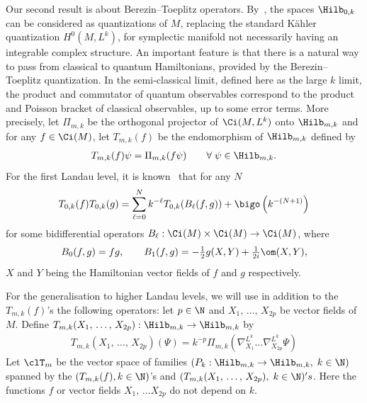 Our second result is about Berezin--Toeplitz operators. By~\cite{BoUr96}, the spaces $\Hilb_{0,k}$ can be considered as quantizations of $M$, replacing the standard K\"ahler quantization $H^0 (M,L^k)$, for symplectic manifold not necessarily having an integrable complex structure. An important feature is that there is a natural way to pass from classical to quantum Hamiltonians, provided by the Berezin--Toeplitz quantization. In the semi-classical limit, defined here as the large $k$ limit, the product and commutator of quantum observables correspond to the product and Poisson bracket of classical observables, up to some error terms. More precisely, let $\Pi_{m,k}$ be the orthogonal projector of $\Ci (M, L^k)$ onto $\Hilb_{m,k}$ and for any $f \in \Ci (M)$, let $T_{m,k} (f)$ be the endomorphism of $\Hilb_{m,k}$ defined by
\begin{gather}\label{eq:toeplitz}
T_{m,k} (f) \psi = \Pi_{m,k} (f \psi)
\qquad \forall \; \psi \in \Hilb_{m,k}.
\end{gather}
For the first Landau level, it is known~\cite{BoMeSc,oim_op,MaMa} that for any $N$
\begin{gather}\label{eq:t_0_k_produit_tout_ordre}
T_{0,k} (f) T_{0,k} (g) = \sum_{\ell = 0 } ^N k^{-\ell} T_{0,k} (B_\ell (f,g)) +
\bigo \left(k^{-(N+1)}\right)
\end{gather}
for some bidifferential operators $B_{\ell} : \Ci (M) \times \Ci (M)
\rightarrow \Ci (M)$, where
\begin{gather}\label{eq:b_0_b_1}
B_0 (f,g) = fg, \qquad B_1(f,g) = - \tfrac{1}{2} g(X,Y) + \tfrac{1}{2i} \om (X, Y),
\end{gather}
$X$ and $Y$ being the Hamiltonian vector fields of $f$ and $g$ respectively.


For the generalisation to higher Landau levels, we will use in addition to the $T_{m,k} (f)$'s the following operators: let $p \in \N$ and $X_1,\, \ldots,\, X_{2p}$ be vector fields of $M$. Define $ T_{m,k} (X_1,\, \ldots,\, X_{2p}):
\Hilb_{m,k} \rightarrow \Hilb_{m,k}$ by
\begin{gather}\label{eq:toep_der}
T_{m,k} (X_1, \,\ldots,\, X_{2p}) (\Psi) = k^{ -p} \Pi_{m,k} \left(\nabla^{L^k}_{X_1} \ldots
\nabla_{X_{2p}}^{L^k} \Psi\right)
\end{gather}
Let $\clT_m$ be the vector space of families $ (P_k : \Hilb_{m,k} \rightarrow
\Hilb_{m,k}, \; k \in \N)$ spanned by the $(T_{m,k} (f), k \in \N)$'s and $(T_{m,k} (X_1, \,\ldots,\, X_{2p}), \; k \in \N) 's$. Here the functions $f$ or vector fields $X_1,\,
\ldots X_{2p}$ do not depend on $k$.

